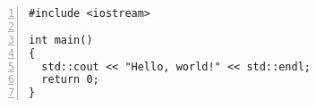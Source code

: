 \documentclass{article}
\begin{document}
\begin{Verbatim}[frame=single, fontsize=\small, numbers=left]
#include <iostream>

int main()
{
  std::cout << "Hello, world!" << std::endl;
  return 0;
}
\end{Verbatim}
\end{document}

